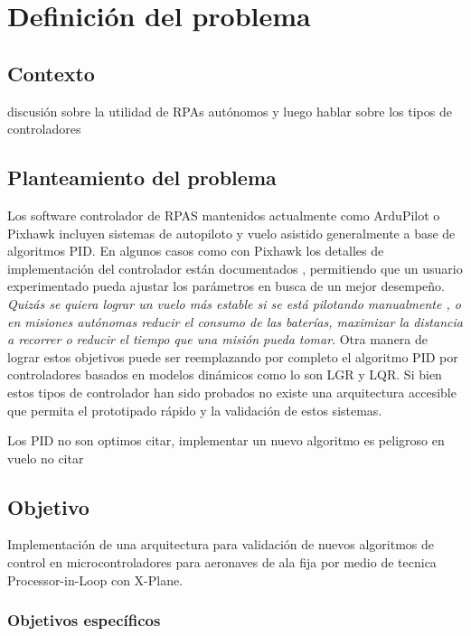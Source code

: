 \chapter{Definición del problema}

\section{Contexto}

discusión sobre la utilidad de RPAs autónomos y luego hablar sobre los tipos de controladores

\section{Planteamiento del problema}

Los software controlador de RPAS mantenidos actualmente como ArduPilot o Pixhawk incluyen sistemas de autopiloto y vuelo asistido generalmente a base de algoritmos PID. En algunos casos como con Pixhawk los detalles de implementación del controlador están documentados \cite{px4-control-diagram}, permitiendo que un usuario experimentado pueda ajustar los parámetros en busca de un mejor desempeño. \emph{Quizás se quiera lograr un vuelo más estable si se está pilotando manualmente \cite{betaflight-pid-tuning}, o en misiones autónomas reducir el consumo de las baterías, maximizar la distancia a recorrer o reducir el tiempo que una misión pueda tomar}. Otra manera de lograr estos objetivos puede ser reemplazando por completo el algoritmo PID por controladores basados en modelos dinámicos como lo son LGR y LQR. Si bien estos tipos de controlador han sido probados \cite{yt-lqr} no existe una arquitectura accesible que permita el prototipado rápido y la validación de estos sistemas.

Los PID no son optimos citar, implementar un nuevo algoritmo es peligroso en vuelo no citar

\section{Objetivo}

Implementación de una arquitectura para validación de nuevos algoritmos de control en microcontroladores para aeronaves de ala fija por medio de tecnica Processor-in-Loop con X-Plane.

\subsection{Objetivos específicos}

